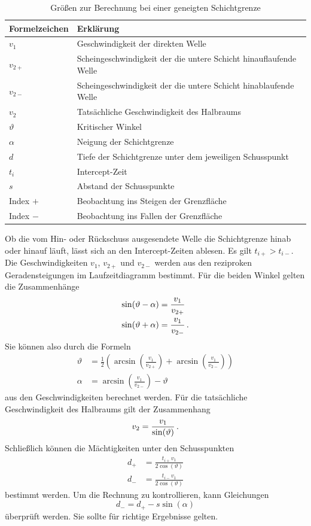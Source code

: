 \begin{table}[!ht]
\centering
\caption{Größen zur Berechnung bei einer geneigten Schichtgrenze}
\label{tab:groessen}
\begin{tabular}{ll}
\toprule
Formelzeichen   & Erklärung  \\
\midrule
$v_1$ & Geschwindigkeit der direkten Welle \\
$v_{2+}$  &  Scheingeschwindigkeit der die untere Schicht hinauflaufende Welle\\
$v_{2-}$  &  Scheingeschwindigkeit der die untere Schicht hinablaufende Welle\\
$v_2$ & Tatsächliche Geschwindigkeit des Halbraums \\
$\vartheta$  &  Kritischer Winkel\\
$\alpha$  &  Neigung der Schichtgrenze \\
$d$  & Tiefe der Schichtgrenze unter dem jeweiligen Schusspunkt \\
$t_i$  &  Intercept-Zeit\\
$s$ & Abstand der Schusspunkte\\
Index $+$  & Beobachtung ins Steigen der Grenzfläche \\
Index $-$  & Beobachtung ins Fallen der Grenzfläche \\
\bottomrule
\end{tabular}
\end{table}

Ob die vom Hin- oder Rückschuss ausgesendete Welle die Schichtgrenze hinab oder hinauf läuft, lässt sich an den Intercept-Zeiten ablesen. Es gilt $t_{i+}>t_{i-}$. Die Geschwindigkeiten $v_1$, $v_{2+}$ und $v_{2-}$ werden aus den reziproken Geradensteigungen im Laufzeitdiagramm bestimmt. Für die beiden Winkel gelten die Zusammenhänge
\begin{align}
 \sin(\vartheta-\alpha)&=\frac{v_1}{v_{2+}} \\
 \sin(\vartheta+\alpha)&=\frac{v_1}{v_{2-}} \text{\,.}
\end{align}
Sie können also durch die Formeln
\begin{align}
 \vartheta&=\frac{1}{2}\left(\arcsin\left(\frac{v_1}{v_{2+}}\right)+\arcsin\left(\frac{v_1}{v_{2-}}\right)\right) \\
 \alpha&=\arcsin\left(\frac{v_1}{v_{2-}}\right)-\vartheta
\end{align}
aus den Geschwindigkeiten berechnet werden. Für die tatsächliche Geschwindigkeit des Halbraums gilt der Zusammenhang
\begin{equation}
 v_2=\frac{v_1}{\sin(\vartheta)} \text{\,.}
\end{equation}
Schließlich können die Mächtigkeiten unter den Schusspunkten
\begin{align}
 d_+&=\frac{t_{i+}v_1}{2\cos(\vartheta)} \\
 d_-&=\frac{t_{i-}v_1}{2\cos(\vartheta)}
\end{align}
bestimmt werden. Um die Rechnung zu kontrollieren, kann Gleichungen
\begin{equation}
 d_-=d_+-s\sin(\alpha)
\end{equation}
überprüft werden. Sie sollte für richtige Ergebnisse gelten.

